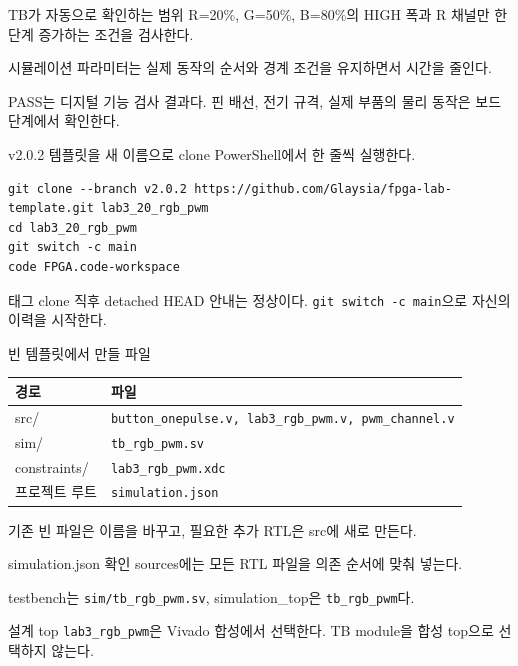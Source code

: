 \begin{frame}{TB가 자동으로 확인하는 범위}
\small
R=20\%, G=50\%, B=80\%의 HIGH 폭과 R 채널만 한 단계 증가하는 조건을 검사한다.\par\vspace{0.28cm}
시뮬레이션 파라미터는 실제 동작의 순서와 경계 조건을 유지하면서 시간을 줄인다.\par\vspace{0.28cm}
PASS는 디지털 기능 검사 결과다. 핀 배선, 전기 규격, 실제 부품의 물리 동작은 보드 단계에서 확인한다.
\end{frame}

\begin{frame}[fragile,label=start]{v2.0.2 템플릿을 새 이름으로 clone}
\small
PowerShell에서 한 줄씩 실행한다.
\begin{lstlisting}[language={}]
git clone --branch v2.0.2 https://github.com/Glaysia/fpga-lab-template.git lab3_20_rgb_pwm
cd lab3_20_rgb_pwm
git switch -c main
code FPGA.code-workspace
\end{lstlisting}
태그 clone 직후 detached HEAD 안내는 정상이다. \texttt{git switch -c main}으로 자신의 이력을 시작한다.
\end{frame}

\begin{frame}{빈 템플릿에서 만들 파일}
\small
\begin{center}\renewcommand{\arraystretch}{1.35}\begin{tabular}{>{\raggedright\arraybackslash}p{2.25cm}p{7.2cm}}
경로 & 파일\\\hline
src/ & \texttt{button\_onepulse.v, lab3\_rgb\_pwm.v, pwm\_channel.v}\\
sim/ & \texttt{tb\_rgb\_pwm.sv}\\
constraints/ & \texttt{lab3\_rgb\_pwm.xdc}\\
프로젝트 루트 & \texttt{simulation.json}\\
\end{tabular}\end{center}
기존 빈 파일은 이름을 바꾸고, 필요한 추가 RTL은 src에 새로 만든다.
\end{frame}

\begin{frame}{simulation.json 확인}
\small
sources에는 모든 RTL 파일을 의존 순서에 맞춰 넣는다.\par\vspace{0.25cm}
testbench는 \texttt{sim/tb\_rgb\_pwm.sv}, simulation\_top은 \texttt{tb\_rgb\_pwm}다.\par\vspace{0.25cm}
설계 top \texttt{lab3\_rgb\_pwm}은 Vivado 합성에서 선택한다. TB module을 합성 top으로 선택하지 않는다.
\end{frame}

